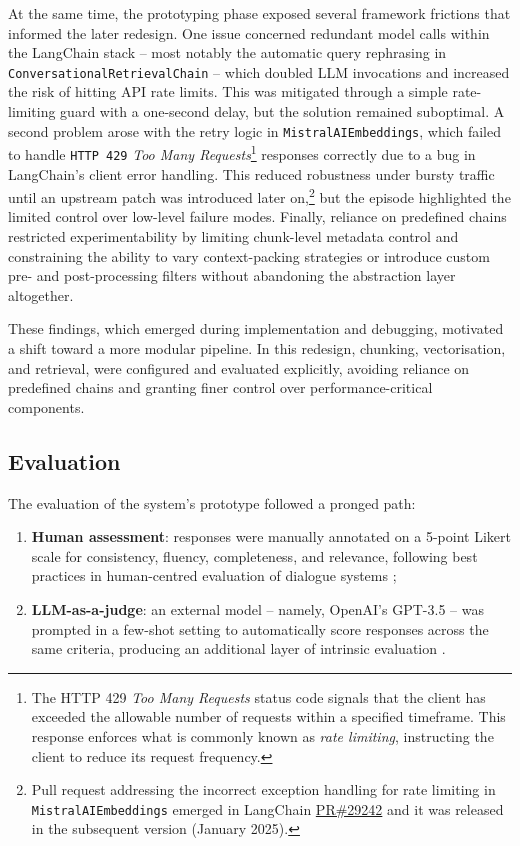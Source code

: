 \begin{spacing}{1.5}
At the same time, the prototyping phase exposed several framework frictions that informed the later redesign. One issue concerned redundant model calls within the LangChain stack -- most notably the automatic query rephrasing in \texttt{ConversationalRetrievalChain} -- which doubled LLM invocations and increased the risk of hitting API rate limits. This was mitigated through a simple rate-limiting guard with a one-second delay, but the solution remained suboptimal. A second problem arose with the retry logic in \texttt{MistralAIEmbeddings}, which failed to handle \texttt{HTTP 429} \textit{Too Many Requests}\footnote{The HTTP 429 \textit{Too Many Requests} status code signals that the client has exceeded the allowable number of requests within a specified timeframe. This response enforces what is commonly known as \textit{rate limiting}, instructing the client to reduce its request frequency.} responses correctly due to a bug in LangChain’s client error handling. This reduced robustness under bursty traffic until an upstream patch was introduced later on,\footnote{Pull request addressing the incorrect exception handling for rate limiting in \texttt{MistralAIEmbeddings} emerged in LangChain \href{https://web.archive.org/web/20250823161804/https://github.com/langchain-ai/langchain/pull/29242}{PR\#29242} and it was released in the subsequent version (January 2025).}\nocite{noauthor_mistralai_2025} but the episode highlighted the limited control over low-level failure modes. Finally, reliance on predefined chains restricted experimentability by limiting chunk-level metadata control and constraining the ability to vary context-packing strategies or introduce custom pre- and post-processing filters without abandoning the abstraction layer altogether.

These findings, which emerged during implementation and debugging, motivated a shift toward a more modular pipeline. In this redesign, chunking, vectorisation, and retrieval, were configured and evaluated explicitly, avoiding reliance on predefined chains and granting finer control over performance-critical components.

\subsection{Evaluation}
The evaluation of the system's prototype followed a pronged path:
\begin{enumerate}
      \item \textbf{Human assessment}: responses were manually annotated on a 5-point Likert scale for consistency, fluency, completeness, and relevance, following best practices in human-centred evaluation of dialogue systems \citep{abeysinghe_challenges_2024,van_der_lee_human_2021};
      \item \textbf{LLM-as-a-judge}: an external model -- namely, OpenAI’s GPT-3.5 -- was prompted in a few-shot setting to automatically score responses across the same criteria, producing an additional layer of intrinsic evaluation \citep{svikhnushina_approximating_2023}.
\end{enumerate}


\end{spacing}

